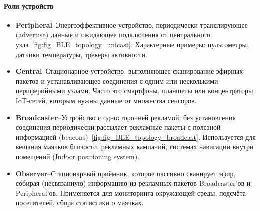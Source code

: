\documentclass[14pt, a4paper]{extreport}
\begin{document}
\paragraph{Роли устройств}
\begin{itemize}
  \item \textbf{Peripheral}--Энергоэффективное устройство, периодически транслирующее (advertise) данные и ожидающее подключения от центрального
  узла~\ref{fig:fig_BLE_topology_unicast}. Характерные примеры: пульсометры, датчики температуры, трекеры активности.

  \item \textbf{Central}--Стационарное устройство, выполняющее сканирование эфирных пакетов и устанавливающее соединения с одним или несколькими периферийными узлами. Часто это
  смартфоны, планшеты или концентраторы IoT-сетей, которым нужны данные от множества сенсоров.

  \item \textbf{Broadcaster}--Устройство с односторонней рекламой: без установления соединения периодически рассылает рекламные пакеты с полезной информацией
  (beacons)~\ref{fig:fig_BLE_topology_broadcast}. Используется для вещания маячков близости, рекламных кампаний, системах навигации внутри помещений (Indoor positioning system).
  
  \item \textbf{Observer}--Стационарный приёмник, которое пассивно сканирует эфир, собирая (несвязанную) информацию из рекламных пакетов Broadcaster’ов и Peripheral’ов. Применяется
  для мониторинга окружающей среды, подсчёта посетителей, сбора статистики о маячках.
\end{itemize}
\end{document}
